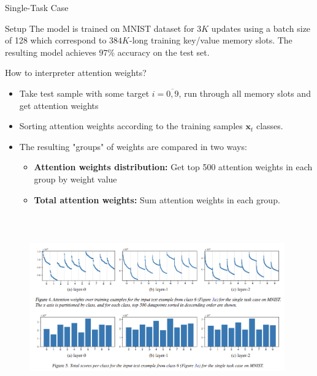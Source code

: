 \documentclass{beamer}
\begin{document}
\begin{frame}{Single-Task Case}
    \begin{block}{Setup}
        The model is trained on MNIST dataset for $3K$ updates using a batch size of 128 which correspond to $384 K$-long training key/value memory slots. The resulting model achieves $97\%$ accuracy on the test set.
    \end{block}
    \begin{block}{How to interpreter attention weights?}
        \begin{itemize}
            \item Take test sample with some target $i=\overline{0, 9}$, run through all memory slots and get attention weights
            \item Sorting attention weights according to the training samples $\mathbf{x}_t$ classes.
            \item The resulting "groups" of weights are compared in two ways:
            \begin{itemize}
                \item \textbf{Attention weights distribution:} Get top 500 attention weights in each group by weight value
                \item \textbf{Total attention weights:} Sum attention weights in each group.
            \end{itemize}
        \end{itemize}
    \end{block}
\end{frame}

\begin{frame}
    \begin{figure}[h]
    \centering
    \includegraphics[width=11cm, height=8cm]{Single_task_sample.png}
\end{figure}
\end{frame}
\end{document}
